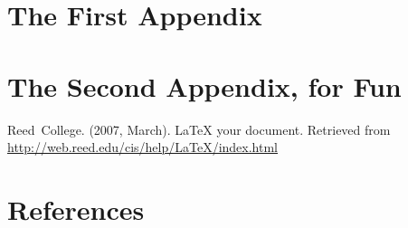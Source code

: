 \documentclass[12pt,twoside]{reedthesis}
\begin{document}
  \appendix
  \chapter{The First Appendix} \chapter{The Second Appendix, for Fun}
  
  \backmatter
  
  \setlength{\parindent}{-0.5in} \setlength{\leftskip}{0.5in}
  \setlength{\parskip}{8pt}
  
  Reed~College. (2007, March). LaTeX your document. Retrieved from
  \url{http://web.reed.edu/cis/help/LaTeX/index.html}

  \chapter{References}

\end{document}
